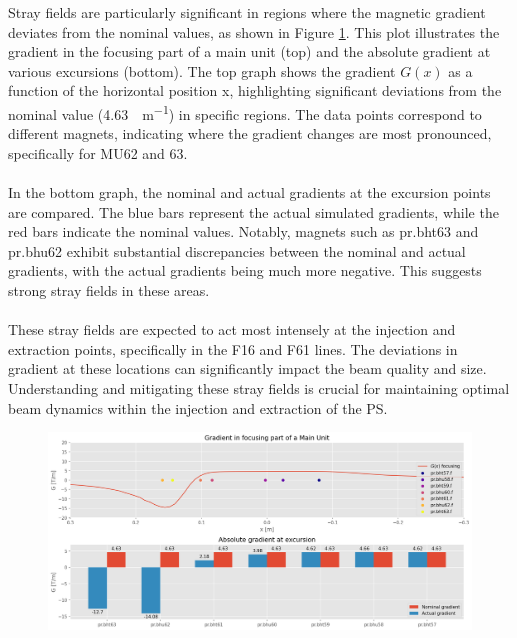 Stray fields are particularly significant in regions where the magnetic gradient deviates from the nominal values, as shown in Figure \ref{fig:stray_field_loc}. This plot illustrates the gradient in the focusing part of a main unit (top) and the absolute gradient at various excursions (bottom). The top graph shows the gradient 
$G(x)$ as a function of the horizontal position x, highlighting significant deviations from the nominal value (\SI{4.63}{\Tesla\per\meter}) in specific regions. The data points correspond to different magnets, indicating where the gradient changes are most pronounced, specifically for MU62 and 63.
\\
\\
In the bottom graph, the nominal and actual gradients at the excursion points are compared. The blue bars represent the actual simulated gradients, while the red bars indicate the nominal values. Notably, magnets such as pr.bht63 and pr.bhu62 exhibit substantial discrepancies between the nominal and actual gradients, with the actual gradients being much more negative. This suggests strong stray fields in these areas.
\\
\\
These stray fields are expected to act most intensely at the injection and extraction points, specifically in the F16 and F61 lines. The deviations in gradient at these locations can significantly impact the beam quality and size. Understanding and mitigating these stray fields is crucial for maintaining optimal beam dynamics within the injection and extraction of the PS.

\begin{figure}[H]
\centering
\includegraphics[width=1.0\textwidth]{01_Introduction/images/stray_field_location.png}
\caption{}
\label{fig:stray_field_loc}
\end{figure}

